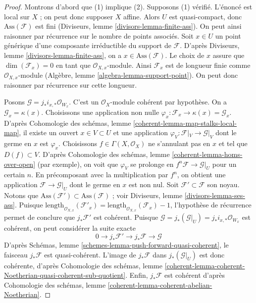 \begin{proof}
Montrons d'abord que (1) implique (2). Supposons (1) vérifié. L'énoncé est local sur $X$ ; on peut donc supposer $X$ affine. Alors $U$ est quasi-compact, donc $\text{Ass}(\mathcal{F})$ est fini (Diviseurs, lemme \ref{divisors-lemma-finite-ass}). On peut ainsi raisonner par récurrence sur le nombre de points associés. Soit $x \in U$ un point générique d'une composante irréductible du support de $\mathcal{F}$. D'après Diviseurs, lemme \ref{divisors-lemma-finite-ass}, on a $x \in \text{Ass}(\mathcal{F})$. Le choix de $x$ assure que $\dim(\mathcal{F}_x) = 0$ en tant que $\mathcal{O}_{X, x}$-module. Ainsi $\mathcal{F}_x$ est de longueur finie comme $\mathcal{O}_{X, x}$-module (Algèbre, lemme \ref{algebra-lemma-support-point}). On peut donc raisonner par récurrence sur cette longueur.

\medskip\noindent
Posons $\mathcal{G} = j_*i_{x, *}\mathcal{O}_{W_x}$. C'est un $\mathcal{O}_X$-module cohérent par hypothèse. On a $\mathcal{G}_x = \kappa(x)$. Choisissons une application non nulle $\varphi_x : \mathcal{F}_x \to \kappa(x) = \mathcal{G}_x$. D'après Cohomologie des schémas, lemme \ref{coherent-lemma-map-stalks-local-map}, il existe un ouvert $x \in V \subset U$ et une application $\varphi_V : \mathcal{F}|_V \to \mathcal{G}|_V$ dont le germe en $x$ est $\varphi_x$. Choisissons $f \in \Gamma(X, \mathcal{O}_X)$ ne s'annulant pas en $x$ et tel que $D(f) \subset V$. D'après Cohomologie des schémas, lemme \ref{coherent-lemma-homs-over-open} (par exemple), on voit que $\varphi_V$ se prolonge en $f^n\mathcal{F} \to \mathcal{G}|_U$ pour un certain $n$. En précomposant avec la multiplication par $f^n$, on obtient une application $\mathcal{F} \to \mathcal{G}|_U$ dont le germe en $x$ est non nul. Soit $\mathcal{F}' \subset \mathcal{F}$ son noyau. Notons que $\text{Ass}(\mathcal{F}') \subset \text{Ass}(\mathcal{F})$ ; voir Diviseurs, lemme \ref{divisors-lemma-ses-ass}. Puisque $\text{length}_{\mathcal{O}_{X, x}}(\mathcal{F}'_x) =
\text{length}_{\mathcal{O}_{X, x}}(\mathcal{F}_x) - 1$, l'hypothèse de récurrence permet de conclure que $j_*\mathcal{F}'$ est cohérent. Puisque $\mathcal{G} = j_*(\mathcal{G}|_U) = j_*i_{x, *}\mathcal{O}_{W_x}$ est cohérent, on peut considérer la suite exacte
$$
0 \to j_*\mathcal{F}' \to j_*\mathcal{F} \to \mathcal{G}
$$
D'après Schémas, lemme \ref{schemes-lemma-push-forward-quasi-coherent}, le faisceau $j_*\mathcal{F}$ est quasi-cohérent. L'image de $j_*\mathcal{F}$ dans $j_*(\mathcal{G}|_U)$ est donc cohérente, d'après Cohomologie des schémas, lemme \ref{coherent-lemma-coherent-Noetherian-quasi-coherent-sub-quotient}. Enfin, $j_*\mathcal{F}$ est cohérent d'après Cohomologie des schémas, lemme \ref{coherent-lemma-coherent-abelian-Noetherian}.


\end{proof}
